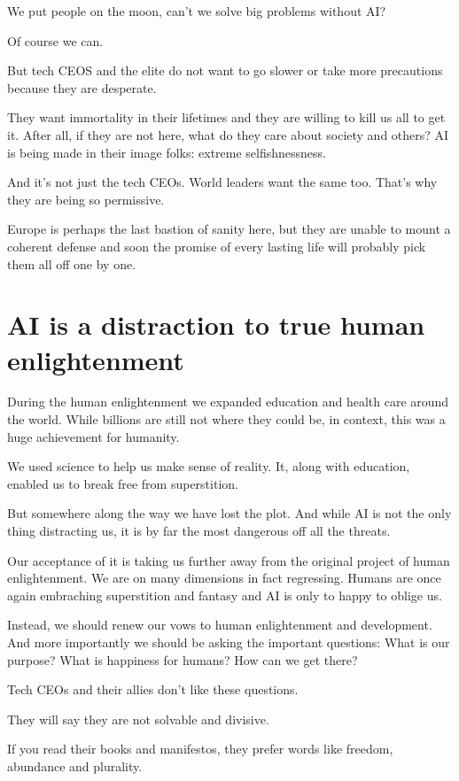 \documentclass[11pt]{article}
\begin{document}
We put people on the moon, can't we solve big problems without AI?

Of course we can.

But tech CEOS and the elite do not want to go slower or take more precautions because they are desperate.

They want immortality in their lifetimes and they are willing to kill us all to get it. After all, if they are not here, what do they care about society and others? AI is being made in their image folks: extreme selfishnessness.

And it's not just the tech CEOs. World leaders want the same too. That's why they are being so permissive.

Europe is perhaps the last bastion of sanity here, but they are unable to mount a coherent defense and soon the promise of every lasting life will probably pick them all off one by one.
\section{AI is a distraction to true human enlightenment}
\label{sec:orgf1d3700}

During the human enlightenment we expanded education and health care around the world. While billions are still not where they could be, in context, this was a huge achievement for humanity.

We used science to help us make sense of reality. It, along with education, enabled us to break free from superstition. 

But somewhere along the way we have lost the plot. And while AI is not the only thing distracting us, it is by far the most dangerous off all the threats.

Our acceptance of it is taking us further away from the original project of human enlightenment. We are on many dimensions in fact regressing. Humans are once again embraching superstition and fantasy and AI is only to happy to oblige us.

Instead, we should renew our vows to human enlightenment and development. And more importantly we should be asking the important questions: What is our purpose? What is happiness for humans? How can we get there?

Tech CEOs and their allies don't like these questions.

They will say they are not solvable and divisive. 

If you read their books and manifestos, they prefer words like freedom, abundance and plurality.
\end{document}
